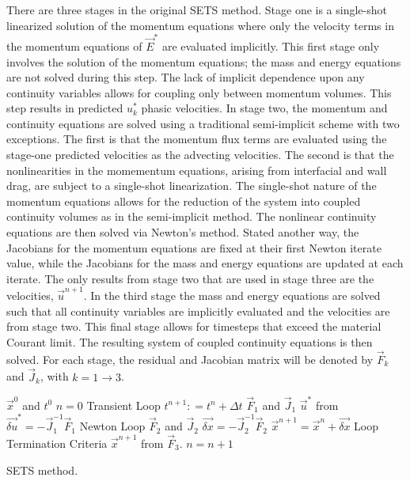 There are three stages in the original SETS method.
Stage one is a single-shot linearized solution of the momentum equations where only the velocity terms in the momentum equations of $\vec{E}^{*}$ are evaluated implicitly.
This first stage only involves the solution of the momentum equations; the mass and energy equations are not solved during this step.
The lack of implicit dependence upon any continuity variables allows for coupling only between momentum volumes.
This step results in predicted $u^{*}_{k}$ phasic velocities.
In stage two, the momentum and continuity equations are solved using a traditional semi-implicit scheme with two exceptions.
The first is that the momentum flux terms are evaluated using the stage-one predicted velocities as the advecting velocities.
The second is that the nonlinearities in the momementum equations, arising from interfacial and wall drag, are subject to a single-shot linearization.
The single-shot nature of the momentum equations allows for the reduction of the system into coupled continuity volumes as in the semi-implicit method.
The nonlinear continuity equations are then solved via Newton's method.
Stated another way, the Jacobians for the momentum equations are fixed at their first Newton iterate value, while the Jacobians for the mass and energy equations are updated at each iterate.
The only results from stage two that are used in stage three are the velocities, $\vec{u}^{n+1}$.
In the third stage the mass and energy equations are solved such that all continuity variables are implicitly evaluated and the velocities are from stage two.
This final stage allows for timesteps that exceed the material Courant limit.
The resulting system of coupled continuity equations is then solved.
For each stage, the residual and Jacobian matrix will be denoted by $\vec{F}_k$ and $\vec{J}_k$, with $k = 1 \to 3$.

\begin{algo}[H]
\setlength{\baselineskip}{0.625\baselineskip}
\begin{algorithmic}[1]
\Require $\vec{x}^{0}$ and $t^{0}$
\Set $n = 0$
\Loop \; Transient Loop
    \State $t^{n+1} : = t^{n} + \Delta t$
	\Calculate $\vec{F}_1$ and $\vec{J}_1$
	\Calculate $\vec{u}^{*}$ from $\vec{\delta u}^{*} = -\vec{J}^{-1}_1\vec{F}_1$
	\Loop \; Newton Loop
		\Calculate $\vec{F}_2$ and $\vec{J}_2$
		\BlackBox $\vec{\delta x} = - \vec{J}_2^{-1}\vec{F}_2$
		\Calculate $\vec{x}^{n+1} = \vec{x}^{n} + \vec{\delta x}$
		\BlackBox Loop Termination Criteria
	\EndLoop
	\Calculate $\vec{x}^{n+1}$ from $\vec{F}_3$.
	\State $n = n + 1$
\EndLoop
\end{algorithmic}
\caption{SETS method.}
\label{alg:sets}
\end{algo}

